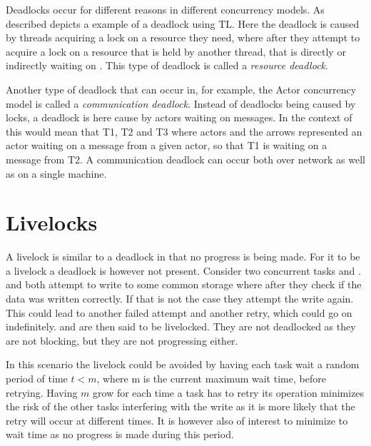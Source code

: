 Deadlocks occur for different reasons in different concurrency models. As described  depicts a example of a deadlock using \ac{TL}. Here the deadlock is caused by threads acquiring a lock on a resource they need, where after they attempt to acquire a lock on a resource that is held by another thread, that is directly or indirectly waiting on . This type of deadlock is called a \emph{resource deadlock}\cite[p. 435]{tanenbaum2008modern}. 

Another type of deadlock that can occur in, for example, the Actor concurrency model is called a \emph{communication deadlock}\cite[p. 124]{tanenbaum2008modern}. Instead of deadlocks being caused by locks, a deadlock is here cause by actors waiting on messages. In the context of  this would mean that T1, T2 and T3 where actors and the arrows represented an actor waiting on a message from a given actor, so that T1 is waiting on a message from T2. A communication deadlock can occur both over network as well as on a single machine.

\section{Livelocks} A livelock is similar to a deadlock in that no progress is being made. For it to be a livelock a deadlock is however not present. Consider two concurrent tasks  and .  and  both attempt to write to some common storage where after they check if the data was written correctly. If that is not the case they attempt the write again. This could lead to another failed attempt and another retry, which could go on indefinitely.  and  are then said to be livelocked. They are not deadlocked as they are not blocking, but they are not progressing either. 

In this scenario the livelock could be avoided by having each task wait a random period of time $t < m$, where m is the current maximum wait time, before retrying. Having $m$ grow for each time a task has to retry its operation minimizes the risk of the other tasks interfering with the write as it is more likely that the retry will occur at different times. It is however also of interest to minimize to wait time as no progress is made during this period.



